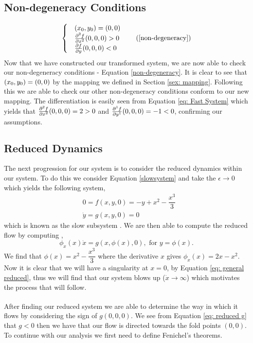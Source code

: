 \subsection{Non-degeneracy Conditions}
\begin{equation}
    \begin{cases}
        &\folds=(0,0)\\
        &\pd[2]{f}{x}(0,0,0)>0\\
        &\pd{f}{y}(0,0,0)<0
    \end{cases} 
    \tag{\ref{non-degeneracy}}
\end{equation}
Now that we have constructed our transformed system, we are now able to check our non-degeneracy conditions - Equation \ref{non-degeneracy}. It is clear to see that $(x_0,y_0)=(0,0)$ by the mapping we defined in Section \ref{sex: mapping}. Following this we are able to check our other non-degeneracy conditions conform to our new mapping. The differentiation is easily seen from Equation \ref{eq: Fast System} which yields that $\pd[2]{f}{x}(0,0,0)=2>0$ and $\pd[1]{f}{y}(0,0,0)=-1<0$, confirming our assumptions.


\subsection{Reduced Dynamics}
The next progression for our system is to consider the reduced dynamics within our system. To do this we consider Equation \ref{slowsystem} and take the $\epsilon\to0$ which yields the following system,
\begin{subequations}
    \begin{align}
    &0=f(x,y,0)=-y+x^2-\dfrac{x^3}{3}\\
        &\dot{y}=g(x,y,0)=0 \label{eq: reduced g}
    \end{align}
\end{subequations}
which is known as the slow subsystem \citep{Bible}. We are then able to compute the reduced flow by computing  \citep{krupa2001},
\begin{equation}
    \phi_x(x)\dot{x}=g(x,\phi(x),0),\text{ for }y=\phi(x).
    \label{eq: general reduced}
\end{equation}
We find that $\phi(x)=x^2-\dfrac{x^3}{3}$ where the derivative \wrt $x$ gives $\phi_x(x)=2x-x^2$. Now it is clear that we will have a singularity at $x=0$, by Equation \ref{eq: general reduced}, thus we will find that our system blows up ($\dot{x}\to\infty$) which motivates the process that will follow. \\ \\
After finding our reduced system we are able to determine the way in which it flows by considering the sign of $g(0,0,0)$. We see from Equation \ref{eq: reduced g} that $g<0$ then we have that our flow is directed towards the fold points $(0,0)$. To continue with our analysis we first need to define Fenichel's theorems.

